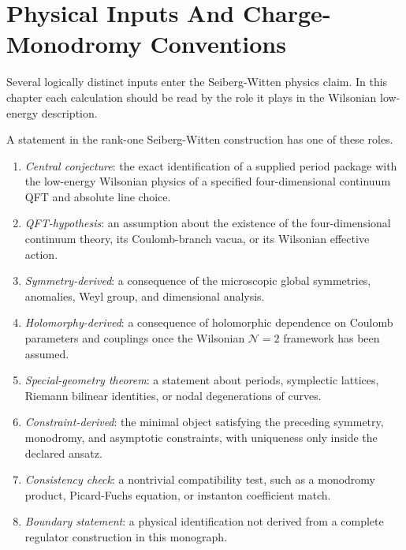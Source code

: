 \section{Physical Inputs And Charge-Monodromy Conventions}
\label{sec:sw-argument-types-charge-monodromy}

Several logically distinct inputs enter the Seiberg-Witten physics claim.  In
this chapter each calculation should be read by the role it plays in the
Wilsonian low-energy description.

\begin{definition}
\label{def:sw-argument-status-labels}
A statement in the rank-one Seiberg-Witten construction has one of these roles.
\begin{enumerate}[label=\textnormal{(\roman*)}]
\item \emph{Central conjecture}: the exact identification of a supplied
  period package with the low-energy Wilsonian physics of a specified
  four-dimensional continuum QFT and absolute line choice.
\item \emph{QFT-hypothesis}: an assumption about the existence of the
  four-dimensional continuum theory, its Coulomb-branch vacua, or its
  Wilsonian effective action.
\item \emph{Symmetry-derived}: a consequence of the microscopic global
  symmetries, anomalies, Weyl group, and dimensional analysis.
\item \emph{Holomorphy-derived}: a consequence of holomorphic dependence on
  Coulomb parameters and couplings once the Wilsonian \(\mathcal N=2\)
  framework has been assumed.
\item \emph{Special-geometry theorem}: a statement about periods, symplectic
  lattices, Riemann bilinear identities, or nodal degenerations of curves.
\item \emph{Constraint-derived}: the minimal object satisfying the preceding
  symmetry, monodromy, and asymptotic constraints, with uniqueness only inside
  the declared ansatz.
\item \emph{Consistency check}: a nontrivial compatibility test, such as a
  monodromy product, Picard-Fuchs equation, or instanton coefficient match.
\item \emph{Boundary statement}: a physical identification not derived
  from a complete regulator construction in this monograph.
\end{enumerate}
\end{definition}

